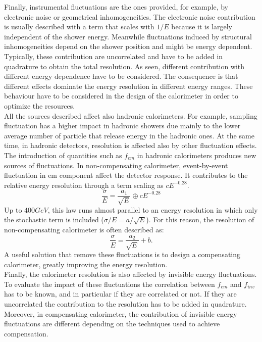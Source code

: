 Finally, instrumental fluctuations are the ones provided, for example, by electronic noise or geometrical inhomogeneities. The electronic noise contribution is usually described with a term that scales with $1/E$ because it is largely independent of the shower energy. Meanwhile fluctuations induced by structural inhomogeneities depend on the shower position and might be energy dependent.\\
Typically, these contribution are uncorrelated and have to be added in quadrature to obtain the total resolution. As seen, different contribution with different energy dependence have to be considered. The consequence is that different effects dominate the energy resolution in different energy ranges. These behaviour have to be considered in the design of the calorimeter in order to optimize the resources.\\

All the sources described affect also hadronic calorimeters. For example, sampling fluctuation has a higher impact in hadronic showers due mainly to the lower average number of particle that release energy in the hadronic ones. 
At the same time, in hadronic detectors, resolution is affected also by other fluctuation effects.\\
The introduction of quantities such as $f_{em}$ in hadronic calorimeters produces new sources of fluctuations. In non-compensating calorimeter, event-by-event fluctuation in em component affect the detector response. It contributes to the relative energy resolution through a term scaling as $c E^{-0.28}$.
\begin{equation}
    \frac{\sigma}{E} = \frac{a_1}{\sqrt{E}} \oplus c E^{-0.28}
\end{equation}
Up to $400 GeV$, this law runs almost parallel to an energy resolution in which only the stochastic term is included ($\sigma/E = a/\sqrt{E}$). For this reason, the resolution of non-compensating calorimeter is often described as:
\begin{equation}
    \frac{\sigma}{E} = \frac{a_2}{\sqrt{E}} + b.
\end{equation}
A useful solution that remove these fluctuations is to design a compensating calorimeter, greatly improving the energy resolution.\\
Finally, the calorimeter resolution is also affected by invisible energy fluctuations. To evaluate the impact of these fluctuations the correlation between $f_{em}$ and $f_{inv}$ has to be known, and in particular if they are correlated or not. If they are uncorrelated the contribution to the resolution has to be added in quadrature. Moreover, in compensating calorimeter, the contribution of invisible energy fluctuations are different depending on the techniques used to achieve compensation.

